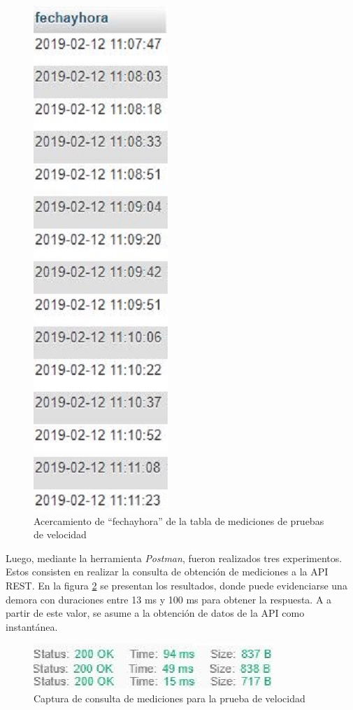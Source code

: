 \begin{figure}[H]
    \centering
    \includegraphics[scale=0.5]{Pruebas/InsercionesZOOM.jpg}
    \caption{Acercamiento de ``fechayhora'' de la tabla de mediciones de pruebas de velocidad}
    \label{fig:pruebasdeInsercionFechayHora}
\end{figure}
\par
Luego, mediante la herramienta \textit{Postman}, fueron realizados tres experimentos. Estos consisten en realizar la consulta de obtención de mediciones a la API REST. En la figura \ref{fig:pruebasdeConsulta} se presentan los resultados, donde puede evidenciarse una demora con duraciones entre 13 ms y 100 ms para obtener la respuesta. A a partir de este valor, se asume a la obtención de datos de la API como instantánea.
\begin{figure}[h]
    \centering
    \includegraphics[scale=1]{Pruebas/postman3en1b.jpg}
    \caption{Captura de consulta de mediciones para la prueba de velocidad}
    \label{fig:pruebasdeConsulta}
\end{figure}

